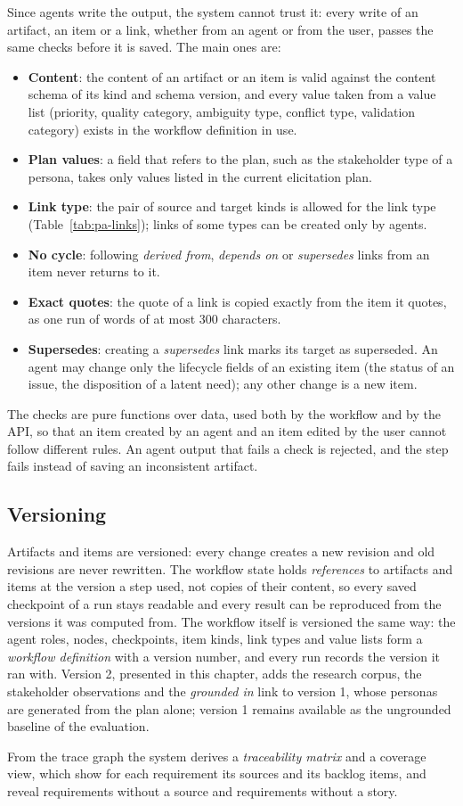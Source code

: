 Since agents write the output, the system cannot trust it: every write of an artifact, an item or a link, whether from an agent or from the user, passes the same checks before it is saved. The main ones are:
\begin{itemize}
    \item \textbf{Content}: the content of an artifact or an item is valid against the content schema of its kind and schema version, and every value taken from a value list (priority, quality category, ambiguity type, conflict type, validation category) exists in the workflow definition in use.
    \item \textbf{Plan values}: a field that refers to the plan, such as the stakeholder type of a persona, takes only values listed in the current elicitation plan.
    \item \textbf{Link type}: the pair of source and target kinds is allowed for the link type (Table~\ref{tab:pa-links}); links of some types can be created only by agents.
    \item \textbf{No cycle}: following \emph{derived from}, \emph{depends on} or \emph{supersedes} links from an item never returns to it.
    \item \textbf{Exact quotes}: the quote of a link is copied exactly from the item it quotes, as one run of words of at most 300 characters.
    \item \textbf{Supersedes}: creating a \emph{supersedes} link marks its target as superseded. An agent may change only the lifecycle fields of an existing item (the status of an issue, the disposition of a latent need); any other change is a new item.
\end{itemize}
The checks are pure functions over data, used both by the workflow and by the API, so that an item created by an agent and an item edited by the user cannot follow different rules. An agent output that fails a check is rejected, and the step fails instead of saving an inconsistent artifact.

\subsection{Versioning}
\label{sec:pa-versioning}

Artifacts and items are versioned: every change creates a new revision and old revisions are never rewritten. The workflow state holds \emph{references} to artifacts and items at the version a step used, not copies of their content, so every saved checkpoint of a run stays readable and every result can be reproduced from the versions it was computed from. The workflow itself is versioned the same way: the agent roles, nodes, checkpoints, item kinds, link types and value lists form a \emph{workflow definition} with a version number, and every run records the version it ran with. Version 2, presented in this chapter, adds the research corpus, the stakeholder observations and the \emph{grounded in} link to version 1, whose personas are generated from the plan alone; version 1 remains available as the ungrounded baseline of the evaluation.

From the trace graph the system derives a \emph{traceability matrix} and a coverage view, which show for each requirement its sources and its backlog items, and reveal requirements without a source and requirements without a story.
